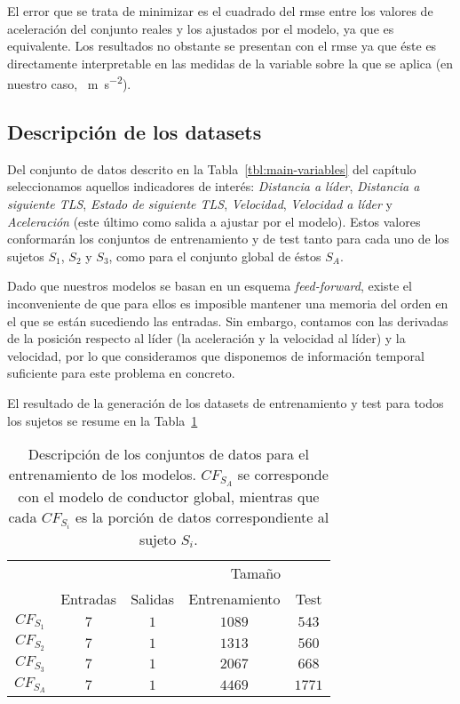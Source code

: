 El error que se trata de minimizar es el cuadrado del \gls{rmse} entre los valores de aceleración del conjunto reales y los ajustados por el modelo, ya que es equivalente. Los resultados no obstante se presentan con el \gls{rmse} ya que éste es directamente interpretable en las medidas de la variable sobre la que se aplica (en nuestro caso, \SI{}{\metre\per\square\second}).

\subsection{Descripción de los datasets}

Del conjunto de datos descrito en la Tabla~\ref{tbl:main-variables} del capítulo~ seleccionamos aquellos indicadores de interés: \textit{Distancia a líder}, \textit{Distancia a siguiente TLS}, \textit{Estado de siguiente TLS}, \textit{Velocidad}, \textit{Velocidad a líder} y \textit{Aceleración} (este último como salida a ajustar por el modelo). Estos valores conformarán los conjuntos de entrenamiento y de test tanto para cada uno de los sujetos $S_1$, $S_2$ y $S_3$, como para el conjunto global de éstos $S_A$.

Dado que nuestros modelos se basan en un esquema \textit{feed-forward}, existe el inconveniente de que para ellos es imposible mantener una memoria del orden en el que se están sucediendo las entradas. Sin embargo, contamos con las derivadas de la posición respecto al líder (la aceleración y la velocidad al líder) y la velocidad, por lo que consideramos que disponemos de información temporal suficiente para este problema en concreto.

El resultado de la generación de los datasets de entrenamiento y test para todos los sujetos se resume en la Tabla~\ref{tbl:cf-datasets-description}

\begin{table}
	\centering
	\caption[Descripción de los conjuntos de datos]{Descripción de los conjuntos de datos para el entrenamiento de los modelos. $CF_{S_A}$ se corresponde con el modelo de conductor global, mientras que cada $CF_{S_i}$ es la porción de datos correspondiente al sujeto $S_i$.}
	\label{tbl:cf-datasets-description}
	\begin{tabular}{ccccc}
		\toprule
		& & & \multicolumn{2}{c}{Tamaño} \\
		& Entradas & Salidas & Entrenamiento & Test \\
		\midrule
		\rowcolor{black!20} $CF_{S_1}$ & $7$ & $1$ & $1089$ & $543$ \\
		$CF_{S_2}$ & $7$ & $1$ & $1313$ & $560$ \\
		\rowcolor{black!20} $CF_{S_3}$ & $7$ & $1$ & $2067$ & $668$ \\
		$CF_{S_A}$ & $7$ & $1$ & $4469$ & $1771$ \\
		\bottomrule
	\end{tabular}
\end{table}

